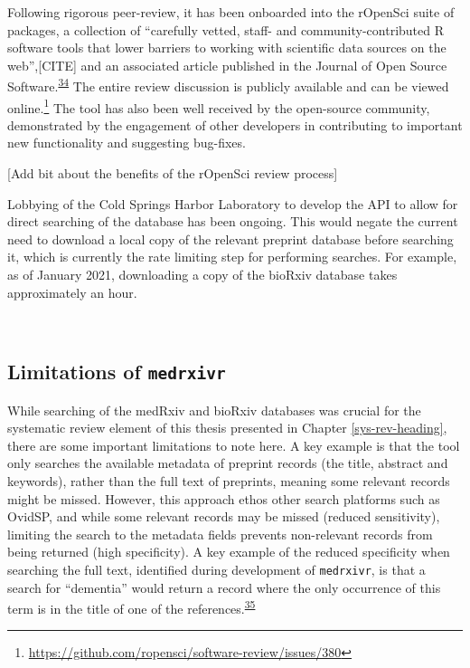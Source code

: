 \documentclass[a4paper, twoside]{templates/ociamthesis}
\begin{document}
Following rigorous peer-review, it has been onboarded into the rOpenSci suite of packages, a collection of ``carefully vetted, staff- and community-contributed R software tools that lower barriers to working with scientific data sources on the web'',{[}CITE{]} and an associated article published in the Journal of Open Source Software.\textsuperscript{\protect\hyperlink{ref-mcguinness2020a}{34}} The entire review discussion is publicly available and can be viewed online.\footnote{\url{https://github.com/ropensci/software-review/issues/380}} The tool has also been well received by the open-source community, demonstrated by the engagement of other developers in contributing to important new functionality and suggesting bug-fixes.

{[}Add bit about the benefits of the rOpenSci review process{]}

Lobbying of the Cold Springs Harbor Laboratory to develop the API to allow for direct searching of the database has been ongoing. This would negate the current need to download a local copy of the relevant preprint database before searching it, which is currently the rate limiting step for performing searches. For example, as of January 2021, downloading a copy of the bioRxiv database takes approximately an hour.

~

\hypertarget{limitations-of-medrxivr}{%
\subsection{\texorpdfstring{Limitations of \texttt{medrxivr}}{Limitations of medrxivr}}\label{limitations-of-medrxivr}}

While searching of the medRxiv and bioRxiv databases was crucial for the systematic review element of this thesis presented in Chapter \ref{sys-rev-heading}, there are some important limitations to note here. A key example is that the tool only searches the available metadata of preprint records (the title, abstract and keywords), rather than the full text of preprints, meaning some relevant records might be missed. However, this approach ethos other search platforms such as OvidSP, and while some relevant records may be missed (reduced sensitivity), limiting the search to the metadata fields prevents non-relevant records from being returned (high specificity). A key example of the reduced specificity when searching the full text, identified during development of \texttt{medrxivr}, is that a search for ``dementia'' would return a record where the only occurrence of this term is in the title of one of the references.\textsuperscript{\protect\hyperlink{ref-bong2019}{35}}
\end{document}
